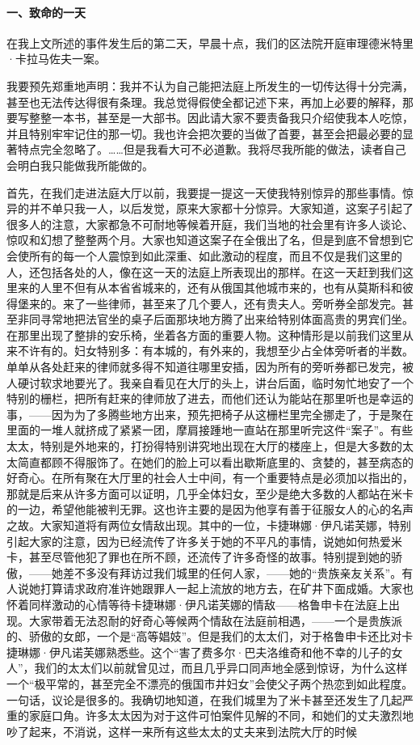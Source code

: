 \paragraph*{一、致命的一天}
\par 在我上文所述的事件发生后的第二天，早晨十点，我们的区法院开庭审理德米特里·卡拉马佐夫一案。
\par 我要预先郑重地声明：我并不认为自己能把法庭上所发生的一切传达得十分完满，甚至也无法传达得很有条理。我总觉得假使全都记述下来，再加上必要的解释，那要写整整一本书，甚至是一大部书。因此请大家不要责备我只介绍使我本人吃惊，并且特别牢牢记住的那一切。我也许会把次要的当做了首要，甚至会把最必要的显著特点完全忽略了。……但是我看大可不必道歉。我将尽我所能的做法，读者自己会明白我只能做我所能做的。
\par 首先，在我们走进法庭大厅以前，我要提一提这一天使我特别惊异的那些事情。惊异的并不单只我一人，以后发觉，原来大家都十分惊异。大家知道，这案子引起了很多人的注意，大家都急不可耐地等候着开庭，我们当地的社会里有许多人谈论、惊叹和幻想了整整两个月。大家也知道这案子在全俄出了名，但是到底不曾想到它会使所有的每一个人震惊到如此深重、如此激动的程度，而且不仅是我们这里的人，还包括各处的人，像在这一天的法庭上所表现出的那样。在这一天赶到我们这里来的人里不但有从本省省城来的，还有从俄国其他城市来的，也有从莫斯科和彼得堡来的。来了一些律师，甚至来了几个要人，还有贵夫人。旁听券全部发完。甚至非同寻常地把法官坐的桌子后面那块地方腾了出来给特别体面高贵的男宾们坐。在那里出现了整排的安乐椅，坐着各方面的重要人物。这种情形是以前我们这里从来不许有的。妇女特别多：有本城的，有外来的，我想至少占全体旁听者的半数。单单从各处赶来的律师就多得不知道往哪里安插，因为所有的旁听券都已发完，被人硬讨软求地要光了。我亲自看见在大厅的头上，讲台后面，临时匆忙地安了一个特别的栅栏，把所有赶来的律师放了进去，而他们还认为能站在那里听也是幸运的事，——因为为了多腾些地方出来，预先把椅子从这栅栏里完全挪走了，于是聚在里面的一堆人就挤成了紧紧一团，摩肩接踵地一直站在那里听完这件“案子”。有些太太，特别是外地来的，打扮得特别讲究地出现在大厅的楼座上，但是大多数的太太简直都顾不得服饰了。在她们的脸上可以看出歇斯底里的、贪婪的，甚至病态的好奇心。在所有聚在大厅里的社会人士中间，有一个重要特点是必须加以指出的，那就是后来从许多方面可以证明，几乎全体妇女，至少是绝大多数的人都站在米卡的一边，希望他能被判无罪。这也许主要的是因为他享有善于征服女人的心的名声之故。大家知道将有两位女情敌出现。其中的一位，卡捷琳娜·伊凡诺芙娜，特别引起大家的注意，因为已经流传了许多关于她的不平凡的事情，说她如何热爱米卡，甚至尽管他犯了罪也在所不顾，还流传了许多奇怪的故事。特别提到她的骄傲，——她差不多没有拜访过我们城里的任何人家，——她的“贵族亲友关系”。有人说她打算请求政府准许她跟罪人一起上流放的地方去，在矿井下面成婚。大家也怀着同样激动的心情等待卡捷琳娜·伊凡诺芙娜的情敌——格鲁申卡在法庭上出现。大家带着无法忍耐的好奇心等候两个情敌在法庭前相遇，——一个是贵族派的、骄傲的女郎，一个是“高等娼妓”。但是我们的太太们，对于格鲁申卡还比对卡捷琳娜·伊凡诺芙娜熟悉些。这个“害了费多尔·巴夫洛维奇和他不幸的儿子的女人”，我们的太太们以前就曾见过，而且几乎异口同声地全感到惊讶，为什么这样一个“极平常的，甚至完全不漂亮的俄国市井妇女”会使父子两个热恋到如此程度。一句话，议论是很多的。我确切地知道，在我们城里为了米卡甚至还发生了几起严重的家庭口角。许多太太因为对于这件可怕案件见解的不同，和她们的丈夫激烈地吵了起来，不消说，这样一来所有这些太太的丈夫来到法院大厅的时候